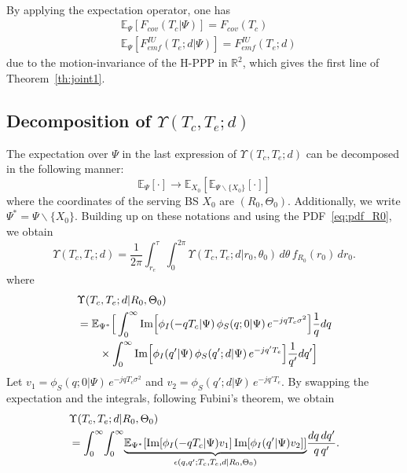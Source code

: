 {{\begin{equation*}
\begin{split}
\end{split}
\end{equation*}}
By applying the expectation operator, one has
\begin{align*}
    &\mathbb E_{\Psi}\left[F_{cov}(T_{c}|\Psi)\right] = F_{cov}(T_{c})\\
    &\mathbb E_{\Psi}\left[F_{emf}^{IU}(T_{e}; d|\Psi)\right] = F_{emf}^{IU}(T_{e}; d)
\end{align*}
due to the motion-invariance of the H-PPP in $\mathbb{R}^2$, which gives the first line of Theorem~\ref{th:joint1}.


\subsection{Decomposition of $\Upsilon(T_{c}, T_{e}; d)$}
\label{ssec:decomposition}
The expectation over $\Psi$ in the last expression of $\Upsilon(T_{c}, T_{e}; d)$ can be decomposed in the following manner:
\begin{equation*}
    \mathbb E_{\Psi}\left[\cdot\right] \to \mathbb E_{X_0}\left[\mathbb E_{\Psi \backslash \{X_0\}}\left[\cdot\right]\right]
\end{equation*}
where the coordinates of the serving BS $X_0$ are $(R_0, \Theta_0)$. Additionally, we write $\Psi^*=\Psi \backslash \{X_0\}$. Building up on these notations and using the PDF~\eqref{eq:pdf_R0}, we obtain
\begin{equation*}
    \Upsilon(T_{c}, T_{e}; d) = \frac{1}{2\pi}\int_{r_e}^{\tau}\int_0^{2\pi}\Upsilon(T_{c}, T_{e}; d| r_0, \theta_0)\,d\theta \,f_{R_0}(r_0)\,dr_0.
\end{equation*}
where
\begin{equation*}\begin{split}
    &\Upsilon(T_{c}, T_{e}; d| R_0, \Theta_0) \\
    &= \mathbb E_{\Psi^*}\Big[ \int_0^\infty \textrm{\normalfont Im}\Big[\phi_{I}(-q T_{c}|\Psi)\,\phi_{S}(q; 0 |\Psi)\, e^{-j q T_{c} \sigma^2}\Big] \frac{1}{q} dq \Big.\\
    &\qquad \Big.\times \int_0^\infty \textrm{\normalfont Im}\Big[\phi_{I}(q'|\Psi)\,\phi_{S}(q'; d|\Psi)\, e^{-j q' T_{e}}\Big] \frac{1}{q'} dq'\Big]
\end{split}\end{equation*}
Let $v_1\! = \!\phi_{S}(q; 0 |\Psi)\, e^{-j q T_{c} \sigma^2}$ and $v_2 \!=\! \phi_{S}(q'; d|\Psi)\, e^{-j q' T_{e}}$. By swapping the expectation and the integrals, following Fubini's theorem, we obtain
\begin{equation}\begin{split}
    &\Upsilon(T_{c}, T_{e}; d| R_0, \Theta_0) \\
    &= \int_0^{\infty} \!\int_0^{\infty} \!\underbrace{\mathbb E_{\Psi^*}\!\left[\textrm{\normalfont Im}\!\left[\phi_{I}(-q T_{c}|\Psi)v_1\right] \textrm{\normalfont Im}\!\left[\phi_{I}(q'|\Psi)v_2\right]\right]}_{\epsilon(q, q';T_{c},T_{e},d|R_0, \Theta_0)}\!\frac{dq\, dq'}{q \,q'}.
\end{split}\end{equation}
}
